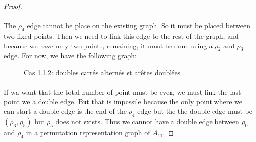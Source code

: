\begin{proof}
  \paragraph{}
  The $\rho_4$ edge cannot be place on the existing graph. So it must be placed between two fixed points. Then we need to link this edge to the rest of the graph, and because we have only two points, remaining, it must be done using a $\rho_2$ and $\rho_3$ edge. For now, we have the following graph:


  \begin{figure}[H]
    \begin{center}
      \caption{Cas 1.1.2: doubles carrés alternés et arêtes doublées}
    \end{center}
  \end{figure}

  \paragraph{}
  If wa want that the total number of point must be even, we must link the last point we a double edge. But that is impossile because the only point where we can start a double edge is the end of the $\rho_4$ edge but the the double edge must be $(\rho_3, \rho_5)$ but $\rho_5$ does not exists. Thus we cannot have a double edge between $\rho_0$ and $\rho_4$ in a permutation representation graph of $A_{11}$.


\end{proof}

